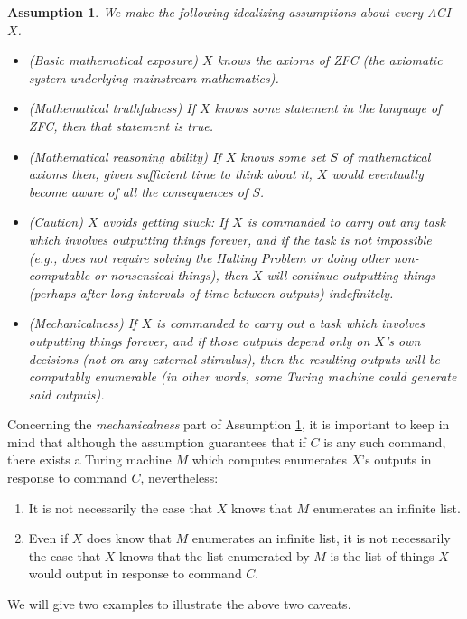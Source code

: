 \documentclass{article}
\newtheorem{assumption}[theorem]{Assumption}
\begin{document}
\begin{assumption}
\label{idealizingassumption}
    We make the following idealizing assumptions about every AGI $X$.
    \begin{itemize}
        \item
        (Basic mathematical exposure) $X$ knows the axioms of ZFC (the axiomatic
        system underlying mainstream mathematics).
        \item
        (Mathematical truthfulness) If $X$ knows some statement in the language
        of ZFC, then that statement is true.
        \item
        (Mathematical reasoning ability) If $X$ knows some set $S$ of mathematical
        axioms then, given sufficient time to think about it, $X$ would eventually
        become aware of all the consequences of $S$.
        \item
        (Caution) $X$ avoids getting stuck: If $X$ is commanded to carry out any
        task which involves outputting things
        forever, and if the task is not impossible
        (e.g., does not require solving the Halting Problem or doing other
        non-computable or nonsensical things),
        then $X$ will continue outputting things (perhaps
        after long intervals of time between outputs) indefinitely.
        \item
        (Mechanicalness) If $X$ is commanded to carry out a task
        which involves outputting things forever, and if those outputs depend only on
        $X$'s own decisions (not on any external stimulus),
        then the resulting outputs will
        be computably enumerable (in other words, some Turing machine could
        generate said outputs).
    \end{itemize}
\end{assumption}

Concerning the \emph{mechanicalness} part of Assumption \ref{idealizingassumption},
it is important to keep in mind that although the assumption guarantees that if $C$
is any such command, there exists a Turing machine $M$ which computes enumerates
$X$'s outputs in response to command $C$, nevertheless:
\begin{enumerate}
    \item
    It is not necessarily the case that $X$ knows that $M$
    enumerates an infinite list.
    \item
    Even if $X$ does know that $M$ enumerates an infinite list, it is not necessarily
    the case that $X$ knows that the list enumerated by $M$ is the list of things
    $X$ would output in response to command $C$.
\end{enumerate}
We will give two examples to illustrate the above two caveats.
\end{document}
